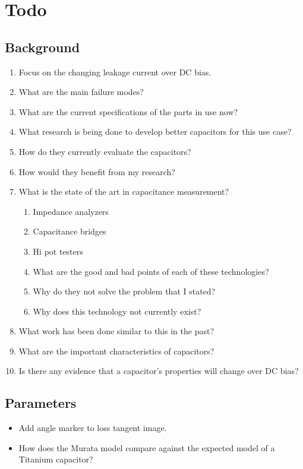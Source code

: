 \documentclass{article}
\begin{document}
\section{Todo}

\subsection{Background}
\begin {enumerate}
    \item Focus on the changing leakage current over DC bias.
    \item What are the main failure modes?
    \item What are the current specifications of the parts in use now?
    \item What research is being done to develop better capacitors for this use case?
    \item How do they currently evaluate the capacitors?
    \item How would they benefit from my research?
    \item What is the state of the art in capacitance measurement?
    \begin {enumerate}
        \item Impedance analyzers
        \item Capacitance bridges
        \item Hi pot testers
        \item What are the good and bad points of each of these technologies?
        \item Why do they not solve the problem that I stated? 
        \item Why does this technology not currently exist?
    \end {enumerate}
    \item What work has been done similar to this in the past?
    \item What are the important characteristics of capacitors?
    \item Is there any evidence that a capacitor's properties will change over DC bias?
\end {enumerate}

\subsection{Parameters}
\begin{itemize}
    \item Add angle marker to loss tangent image.
    \item How does the Murata model compare against the expected model of a Titanium capacitor?
\end{itemize}
\end{document}
